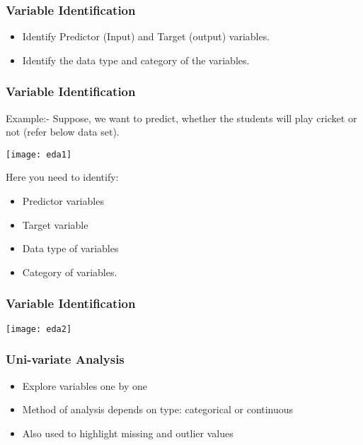 

\begin{frame}[fragile]\frametitle{Variable Identification }	
\begin{itemize}
\item Identify Predictor (Input) and Target (output) variables.
\item Identify the data type and category of the variables. 
\end{itemize}
\end{frame}


\begin{frame}[fragile]\frametitle{Variable Identification }	
Example:- Suppose, we want to predict, whether the students will play cricket or not (refer 
below data set).

\begin{center}
\texttt{[image: eda1]}
\end{center}

Here you need to identify:
\begin{itemize}
\item  Predictor variables
\item Target variable
\item Data type of variables 
\item Category  of  variables.
\end{itemize}
\end{frame}

\begin{frame}[fragile]\frametitle{Variable Identification }	
\begin{center}
\texttt{[image: eda2]}
\end{center}
\end{frame}


\begin{frame}[fragile]\frametitle{Uni-variate Analysis}	
\begin{itemize}
\item  Explore variables one by one
\item Method of analysis depends on type: categorical or continuous
\item Also used to highlight missing and outlier values
\end{itemize}
\end{frame}

